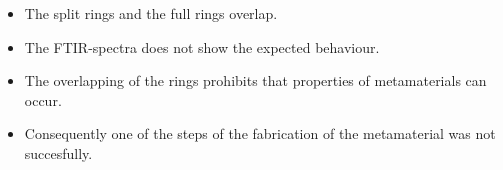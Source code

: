 \begin{itemize}

\item{The split rings and the full rings overlap.} 
\item{The FTIR-spectra does not show the expected behaviour.}
\item{The overlapping of the rings prohibits that properties of metamaterials can occur.}
\item{Consequently one of the steps of the fabrication of the metamaterial was not succesfully.}
\end{itemize}  
